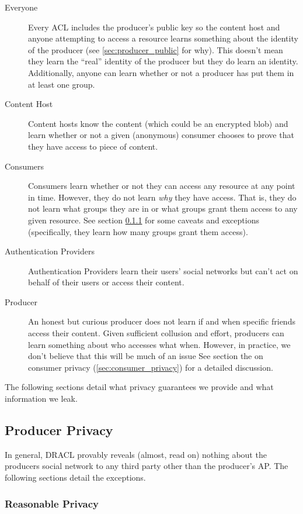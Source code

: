 \documentclass[pdftex,12pt,a4papaer,twoside,notitlepage]{report}
\begin{document}
\begin{description}
\item[Everyone] Every ACL includes the producer's public key so the content host
  and anyone attempting to access a resource learns something about the identity
  of the producer (see \cref{sec:producer_public} for why). This doesn't mean
  they learn the ``real'' identity of the producer but they do learn an
  identity. Additionally, anyone can learn whether or not a producer has put
  them in at least one group.
\item[Content Host] Content hosts know the content (which could be an encrypted
  blob) and learn whether or not a given (anonymous) consumer chooses to prove
  that they have access to piece of content.
\item[Consumers] Consumers learn whether or not they can access any resource at
  any point in time. However, they do not learn \emph{why} they have access.
  That is, they do not learn what groups they are in or what groups grant them
  access to any given resource. See section \cref{sec:resonable_privacy} for
  some caveats and exceptions (specifically, they learn how many groups grant
  them access).
\item[Authentication Providers] Authentication Providers learn their users'
  social networks but can't act on behalf of their users or access their
  content.
\item[Producer] An honest but curious producer does not learn if and when
  specific friends access their content. Given sufficient collusion and effort,
  producers can learn something about who accesses what when. However, in
  practice, we don't believe that this will be much of an issue See section the
  on consumer privacy (\cref{sec:consumer_privacy}) for a detailed discussion.
\end{description}

The following sections detail what privacy guarantees we provide and what
information we leak.

\subsection{Producer Privacy}
\label{sec:producer_privacy}

In general, DRACL provably reveals (almost, read on) nothing about the producers
social network to any third party other than the producer's AP. The following
sections detail the exceptions.

\subsubsection{Reasonable Privacy}
\label{sec:resonable_privacy}
\end{document}
